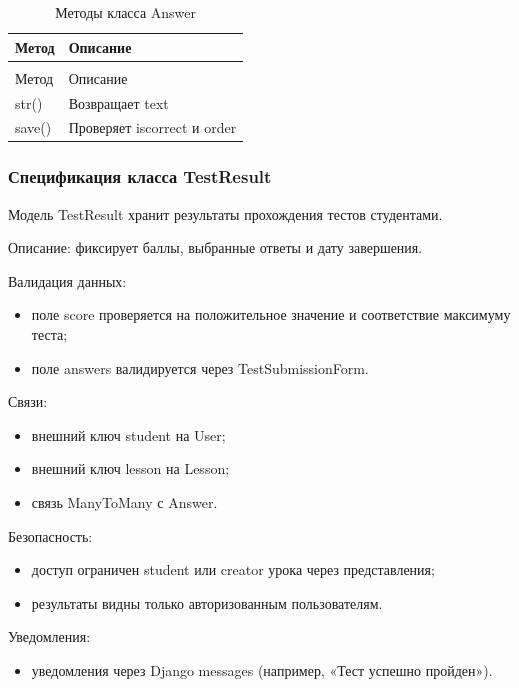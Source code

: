 \begin{xltabular}{\textwidth}{|l|X|}
	\caption{Методы класса Answer\label{tab:answer_methods}}\\
	\hline
	Метод & Описание \\ \hline
	\endfirsthead
	\\
	\hline
	Метод & Описание \\ \hline
	\endhead
	str() & Возвращает text \\ \hline
	save() & Проверяет iscorrect и order \\ \hline
\end{xltabular}

\subsubsection{Спецификация класса TestResult}

Модель TestResult хранит результаты прохождения тестов студентами.


Описание: фиксирует баллы, выбранные ответы и дату завершения.

Валидация данных:
	\begin{itemize}
		\item поле score проверяется на положительное значение и соответствие максимуму теста;
		\item поле answers валидируется через TestSubmissionForm.
	\end{itemize}
	
Связи:
	\begin{itemize}
		\item внешний ключ student на User;
		\item внешний ключ lesson на Lesson;
		\item связь ManyToMany с Answer.
	\end{itemize}
	
Безопасность:
	\begin{itemize}
		\item доступ ограничен student или creator урока через представления;
		\item результаты видны только авторизованным пользователям.
	\end{itemize}
	
Уведомления:
	\begin{itemize}
		\item уведомления через Django messages (например, «Тест успешно пройден»).
	\end{itemize}
	
